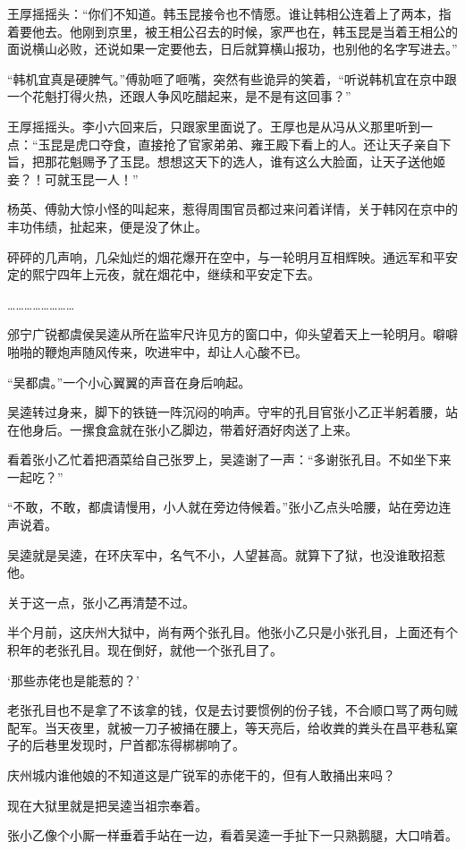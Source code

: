 王厚摇摇头：“你们不知道。韩玉昆接令也不情愿。谁让韩相公连着上了两本，指着要他去。他刚到京里，被王相公召去的时候，家严也在，韩玉昆是当着王相公的面说横山必败，还说如果一定要他去，日后就算横山报功，也别他的名字写进去。”

“韩机宜真是硬脾气。”傅勍咂了咂嘴，突然有些诡异的笑着，“听说韩机宜在京中跟一个花魁打得火热，还跟人争风吃醋起来，是不是有这回事？”

王厚摇摇头。李小六回来后，只跟家里面说了。王厚也是从冯从义那里听到一点：“玉昆是虎口夺食，直接抢了官家弟弟、雍王殿下看上的人。还让天子亲自下旨，把那花魁赐予了玉昆。想想这天下的选人，谁有这么大脸面，让天子送他姬妾？！可就玉昆一人！”

杨英、傅勍大惊小怪的叫起来，惹得周围官员都过来问着详情，关于韩冈在京中的丰功伟绩，扯起来，便是没了休止。

砰砰的几声响，几朵灿烂的烟花爆开在空中，与一轮明月互相辉映。通远军和平安定的熙宁四年上元夜，就在烟花中，继续和平安定下去。

……………………

邠宁广锐都虞侯吴逵从所在监牢尺许见方的窗口中，仰头望着天上一轮明月。噼噼啪啪的鞭炮声随风传来，吹进牢中，却让人心酸不已。

“吴都虞。”一个小心翼翼的声音在身后响起。

吴逵转过身来，脚下的铁链一阵沉闷的响声。守牢的孔目官张小乙正半躬着腰，站在他身后。一摞食盒就在张小乙脚边，带着好酒好肉送了上来。

看着张小乙忙着把酒菜给自己张罗上，吴逵谢了一声：“多谢张孔目。不如坐下来一起吃？”

“不敢，不敢，都虞请慢用，小人就在旁边侍候着。”张小乙点头哈腰，站在旁边连声说着。

吴逵就是吴逵，在环庆军中，名气不小，人望甚高。就算下了狱，也没谁敢招惹他。

关于这一点，张小乙再清楚不过。

半个月前，这庆州大狱中，尚有两个张孔目。他张小乙只是小张孔目，上面还有个积年的老张孔目。现在倒好，就他一个张孔目了。

‘那些赤佬也是能惹的？’

老张孔目也不是拿了不该拿的钱，仅是去讨要惯例的份子钱，不合顺口骂了两句贼配军。当天夜里，就被一刀子被捅在腰上，等天亮后，给收粪的粪头在昌平巷私窠子的后巷里发现时，尸首都冻得梆梆响了。

庆州城内谁他娘的不知道这是广锐军的赤佬干的，但有人敢捅出来吗？

现在大狱里就是把吴逵当祖宗奉着。

张小乙像个小厮一样垂着手站在一边，看着吴逵一手扯下一只熟鹅腿，大口啃着。

